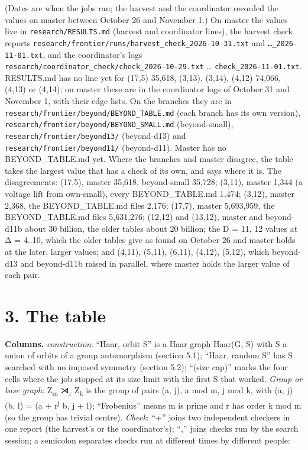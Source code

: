 \documentclass[
  10pt,
]{article}
\begin{document}
(Dates are when the jobs ran; the harvest and the coordinator recorded the values on master between October 26 and
November 1.) On master the values live in \texttt{research/\allowbreak{}RESULTS.md} (harvest and coordinator lines), the harvest
check reports \texttt{research/\allowbreak{}frontier/\allowbreak{}runs/\allowbreak{}harvest\_\allowbreak{}check\_\allowbreak{}2026-10-31.txt} and \texttt{…\_\allowbreak{}2026-11-01.txt}, and the
coordinator's logs \texttt{research/\allowbreak{}coordinator\_\allowbreak{}check/\allowbreak{}check\_\allowbreak{}2026-10-29.txt} \ldots{} \texttt{check\_\allowbreak{}2026-11-01.txt}.
RESULTS.md has no line yet for (17,5) 35,618, (3,13), (3,14), (4,12) 74,066, (4,13) or (4,14); on master these are in
the coordinator logs of October 31 and November 1, with their edge lists. On the branches they are in
\texttt{research/\allowbreak{}frontier/\allowbreak{}beyond/\allowbreak{}BEYOND\_\allowbreak{}TABLE.md} (each branch has its own version),
\texttt{research/\allowbreak{}frontier/\allowbreak{}beyond/\allowbreak{}BEYOND\_\allowbreak{}SMALL.md} (beyond-small), \texttt{research/\allowbreak{}frontier/\allowbreak{}beyond13/\allowbreak{}} (beyond-d13)
and \texttt{research/\allowbreak{}frontier/\allowbreak{}beyond11/\allowbreak{}} (beyond-d11). Master has no BEYOND\_TABLE.md yet. Where the branches and
master disagree, the table takes the largest value that has a check of its own, and says where it is. The
disagreements: (17,5), master 35,618, beyond-small 35,728; (3,11), master 1,344 (a voltage lift from own-small), every
BEYOND\_TABLE.md 1,474; (3,12), master 2,368, the BEYOND\_TABLE.md files 2,176; (17,7), master 5,693,959, the
BEYOND\_TABLE.md files 5,631,276; (12,12) and (13,12), master and beyond-d11b about 30 billion, the older tables about
20 billion; the D = 11, 12 values at Δ = 4..10, which the older tables give as found on October 26 and master holds at
the later, larger values; and (4,11), (5,11), (6,11), (4,12), (5,12), which beyond-d13 and beyond-d11b raised in
parallel, where master holds the larger value of each pair.

\hypertarget{the-table}{%
\section{3. The table}\label{the-table}}

\textbf{Columns.} \emph{construction}: ``Haar, orbit S'' is a Haar graph Haar(G, S) with S a union of orbits of a
group automorphism (section 5.1); ``Haar, random S'' has S searched with no imposed symmetry (section 5.2); ``(size
cap)'' marks the four cells where the job stopped at its size limit with the first S that worked. \emph{Group or base
graph}: Z\textsubscript{m} ⋊\textsubscript{r} Z\textsubscript{k} is the group of pairs (a, j), a mod m, j mod k, with
(a, j)(b, l) = (a + r\textsuperscript{j} b, j + l); ``Frobenius'' means m is prime and r has order k mod m (so the
group has trivial centre). \emph{Check}: ``+'' joins two independent checkers in one report (the harvest's or the
coordinator's); ``,'' joins checks run by the search session; a semicolon separates checks run at different times by
different people:
\end{document}

